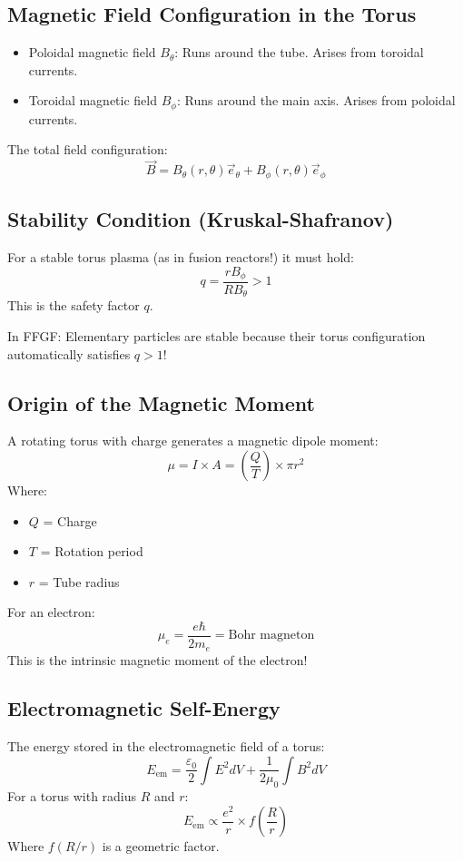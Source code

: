\subsection{Magnetic Field Configuration in the Torus}
\begin{itemize}
	\item Poloidal magnetic field \( B_\theta \):
	Runs around the tube. Arises from toroidal currents.
	\item Toroidal magnetic field \( B_\phi \):
	Runs around the main axis. Arises from poloidal currents.
\end{itemize}

The total field configuration:
\[
\vec{B} = B_\theta(r, \theta) \vec{e}_\theta + B_\phi(r, \theta) \vec{e}_\phi
\]

\subsection{Stability Condition (Kruskal-Shafranov)}
For a stable torus plasma (as in fusion reactors!) it must hold:
\[
q = \frac{r B_\phi}{R B_\theta} > 1
\]
This is the safety factor \( q \).

In FFGF: Elementary particles are stable because their torus configuration automatically satisfies \( q > 1 \)!

\subsection{Origin of the Magnetic Moment}
A rotating torus with charge generates a magnetic dipole moment:
\[
\mu = I \times A = \left(\frac{Q}{T}\right) \times \pi r^2
\]
Where:
\begin{itemize}
	\item \( Q \) = Charge
	\item \( T \) = Rotation period
	\item \( r \) = Tube radius
\end{itemize}

For an electron:
\[
\mu_e = \frac{e \hbar}{2 m_e} = \text{Bohr magneton}
\]
This is the intrinsic magnetic moment of the electron!

\subsection{Electromagnetic Self-Energy}
The energy stored in the electromagnetic field of a torus:
\[
E_{\text{em}} = \frac{\varepsilon_0}{2} \int E^2 dV + \frac{1}{2\mu_0} \int B^2 dV
\]
For a torus with radius \( R \) and \( r \):
\[
E_{\text{em}} \propto \frac{e^2}{r} \times f\left(\frac{R}{r}\right)
\]
Where \( f(R/r) \) is a geometric factor.

